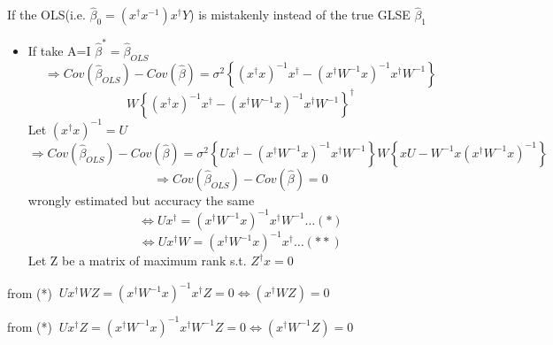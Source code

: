 \documentclass{article}
\begin{document}
\bigskip

If the OLS(i.e. $\hat{\beta}_{0}=\left( x^{\dagger }x^{-1}\right) x^{\dagger
}Y$) is mistakenly instead of the true GLSE $\hat{\beta}_{1}$

\begin{itemize}
\item If take A=I $\hat{\beta}^{\ast }=\hat{\beta}_{OLS}$%
\begin{equation*}
\Rightarrow Cov\left( \hat{\beta}_{OLS}\right) -Cov\left( \hat{\beta}\right)
=\sigma ^{2}\left\{ \left( x^{\dagger }x\right) ^{-1}x^{\dagger }-\left(
x^{\dagger }W^{-1}x\right) ^{-1}x^{\dagger }W^{-1}\right\}
\end{equation*}%
\begin{equation*}
W\left\{ \left( x^{\dagger }x\right) ^{-1}x^{\dagger }-\left( x^{\dagger
}W^{-1}x\right) ^{-1}x^{\dagger }W^{-1}\right\} ^{\dagger }
\end{equation*}%
Let $\left( x^{\dagger }x\right) ^{-1}=U$%
\begin{equation*}
\Rightarrow Cov\left( \hat{\beta}_{OLS}\right) -Cov\left( \hat{\beta}\right)
=\sigma ^{2}\left\{ Ux^{\dagger }-\left( x^{\dagger }W^{-1}x\right)
^{-1}x^{\dagger }W^{-1}\right\} W\left\{ xU-W^{-1}x\left( x^{\dagger
}W^{-1}x\right) ^{-1}\right\}
\end{equation*}%
\begin{equation*}
\Rightarrow Cov\left( \hat{\beta}_{OLS}\right) -Cov\left( \hat{\beta}\right)
=0
\end{equation*}%
wrongly estimated but accuracy the same%
\begin{equation*}
\Leftrightarrow Ux^{\dagger }=\left( x^{\dagger }W^{-1}x\right)
^{-1}x^{\dagger }W^{-1}\ldots \left( \ast \right)
\end{equation*}%
\begin{equation*}
\Leftrightarrow Ux^{\dagger }W=\left( x^{\dagger }W^{-1}x\right)
^{-1}x^{\dagger }\ldots \left( \ast \ast \right)
\end{equation*}%
Let Z be a matrix of maximum rank s.t. $Z^{\dagger }x=0$
\end{itemize}

from (*) $\ Ux^{\dagger }WZ=\left( x^{\dagger }W^{-1}x\right)
^{-1}x^{\dagger }Z=0\Leftrightarrow \left( x^{\dagger }WZ\right) =0$

from (*) $\ Ux^{\dagger }Z=\left( x^{\dagger }W^{-1}x\right) ^{-1}x^{\dagger
}W^{-1}Z=0\Leftrightarrow \left( x^{\dagger }W^{-1}Z\right) =0$
\end{document}
